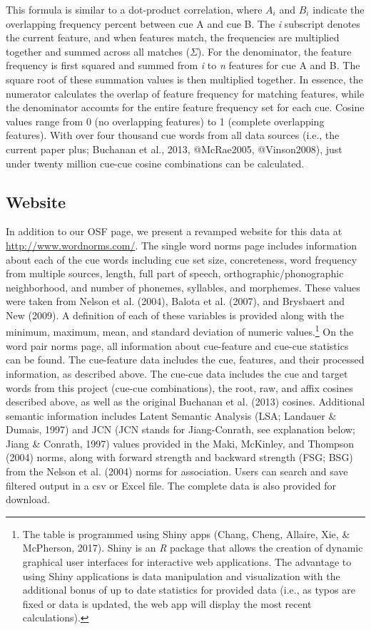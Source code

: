 \documentclass[english,,man]{apa6}
\let\rmarkdownfootnote\footnote%
\def\footnote{\protect\rmarkdownfootnote}
\begin{document}
This formula is similar to a dot-product correlation, where \(A_i\) and \(B_i\) indicate the overlapping frequency percent between cue A and cue B. The \emph{i} subscript denotes the current feature, and when features match, the frequencies are multiplied together and summed across all matches (\(\Sigma\)). For the denominator, the feature frequency is first squared and summed from \emph{i} to \emph{n} features for cue A and B. The square root of these summation values is then multiplied together. In essence, the numerator calculates the overlap of feature frequency for matching features, while the denominator accounts for the entire feature frequency set for each cue. Cosine values range from 0 (no overlapping features) to 1 (complete overlapping features). With over four thousand cue words from all data sources (i.e., the current paper plus; Buchanan et al., 2013, @McRae2005, @Vinson2008), just under twenty million cue-cue cosine combinations can be calculated.

\hypertarget{website}{%
\subsection{Website}\label{website}}

In addition to our OSF page, we present a revamped website for this data at \url{http://www.wordnorms.com/}. The single word norms page includes information about each of the cue words including cue set size, concreteness, word frequency from multiple sources, length, full part of speech, orthographic/phonographic neighborhood, and number of phonemes, syllables, and morphemes. These values were taken from Nelson et al. (2004), Balota et al. (2007), and Brysbaert and New (2009). A definition of each of these variables is provided along with the minimum, maximum, mean, and standard deviation of numeric values.\footnote{The table is programmed using Shiny apps (Chang, Cheng, Allaire, Xie, \& McPherson, 2017). Shiny is an \emph{R} package that allows the creation of dynamic graphical user interfaces for interactive web applications. The advantage to using Shiny applications is data manipulation and visualization with the additional bonus of up to date statistics for provided data (i.e., as typos are fixed or data is updated, the web app will display the most recent calculations).} On the word pair norms page, all information about cue-feature and cue-cue statistics can be found. The cue-feature data includes the cue, features, and their processed information, as described above. The cue-cue data includes the cue and target words from this project (cue-cue combinations), the root, raw, and affix cosines described above, as well as the original Buchanan et al. (2013) cosines. Additional semantic information includes Latent Semantic Analysis (LSA; Landauer \& Dumais, 1997) and JCN (JCN stands for Jiang-Conrath, see explanation below; Jiang \& Conrath, 1997) values provided in the Maki, McKinley, and Thompson (2004) norms, along with forward strength and backward strength (FSG; BSG) from the Nelson et al. (2004) norms for association. Users can search and save filtered output in a csv or Excel file. The complete data is also provided for download.
\end{document}
